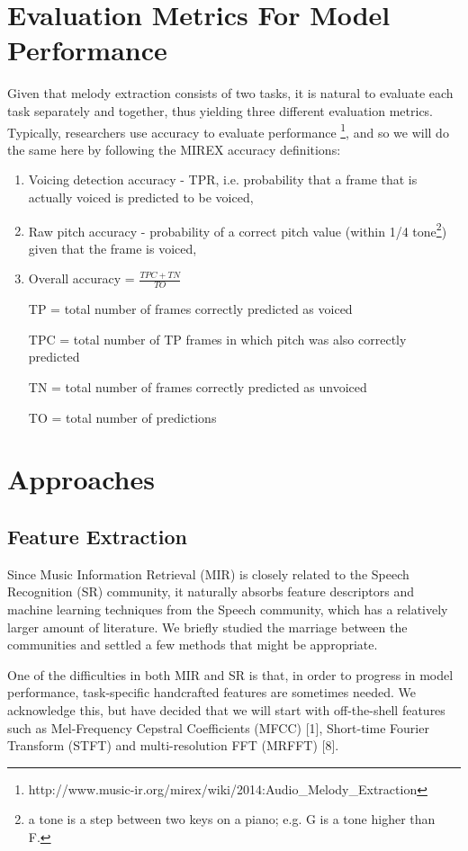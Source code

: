 \documentclass{article} %
\begin{document}
\section{Evaluation Metrics For Model Performance}
Given that melody extraction consists of two tasks, it is natural to evaluate each task separately and together, thus yielding three different evaluation metrics.  Typically, researchers use accuracy to evaluate performance \footnote{http://www.music-ir.org/mirex/wiki/2014:Audio\_Melody\_Extraction}, and so we will do the same here by following the MIREX accuracy definitions:

\begin{enumerate}
\item Voicing detection accuracy - TPR, i.e. probability that a frame that is actually voiced is predicted to be voiced,
\item Raw pitch accuracy - probability of a correct pitch value (within 1/4 tone\footnote{a tone is a step between two keys on a piano; e.g. G is a tone higher than F.}) given that the frame is voiced,
\item Overall accuracy = $\frac{TPC+TN}{TO}$


TP = total number of frames correctly predicted as voiced

TPC = total number of TP frames in which pitch was also correctly predicted

TN = total number of frames correctly predicted as unvoiced

TO = total number of predictions

\end{enumerate}


\section{Approaches}
\subsection{Feature Extraction}
Since Music Information Retrieval (MIR) is closely related to the Speech Recognition (SR) community, it naturally absorbs feature descriptors and 
machine learning techniques from the Speech community, which has a relatively larger amount of literature.
We briefly studied the marriage between the communities and settled a few methods that might be appropriate. 

One of the difficulties in both MIR and SR is that, in order to progress in model performance, task-specific handcrafted features are sometimes needed.  We acknowledge this, but have decided that we will start with off-the-shell features such as Mel-Frequency Cepstral Coefficients (MFCC) [1], Short-time Fourier Transform (STFT) and multi-resolution FFT (MRFFT) [8].
\end{document}
